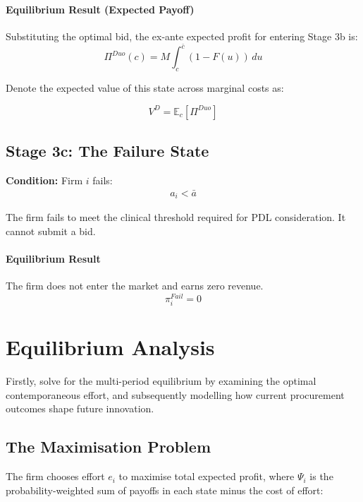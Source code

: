 \documentclass[12pt]{article}
\begin{document}
\paragraph{Equilibrium Result (Expected Payoff)}
Substituting the optimal bid, the ex-ante expected profit for entering Stage 3b is:
\begin{equation} \label{eq:duo_profit}
    \Pi^{Duo}(c) = M \int_{c}^{\bar{c}} (1 - F(u)) \, du
\end{equation}

Denote the expected value of this state across marginal costs as: 

\begin{equation}
V^D = \mathbb{E}_c[\Pi^{Duo}]    
\end{equation}


\subsection{Stage 3c: The Failure State}
\textbf{Condition:} Firm $i$ fails:
\begin{align*}
    a_i < \bar{a}
\end{align*}

The firm fails to meet the clinical threshold required for PDL consideration. It cannot submit a bid.

\paragraph{Equilibrium Result}
The firm does not enter the market and earns zero revenue.
\begin{equation}
    \pi_i^{Fail} = 0
\end{equation}

\newpage

\section{Equilibrium Analysis}
Firstly, solve for the multi-period equilibrium by examining the optimal contemporaneous effort, and subsequently modelling how current procurement outcomes shape future innovation.

\subsection{The Maximisation Problem}
The firm chooses effort $e_i$ to maximise total expected profit, where $\Psi_i$ is the probability-weighted sum of payoffs in each state minus the cost of effort:
\end{document}
